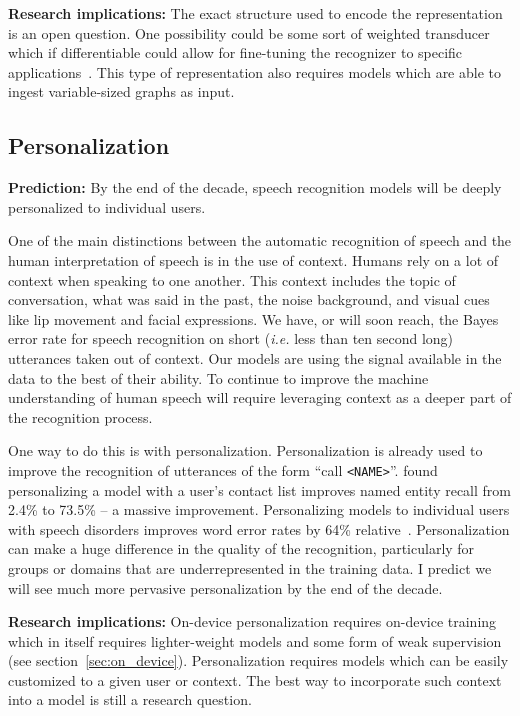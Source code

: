 {\bf Research implications:} The exact structure used to encode the
representation is an open question. One possibility could be some sort of
weighted transducer which if differentiable could allow for fine-tuning the
recognizer to specific applications~\cite{k2, hannun2020differentiable}. This
type of representation also requires models which are able to ingest
variable-sized graphs as input.

\subsection{Personalization}

{\bf Prediction:} By the end of the decade, speech recognition models will be
deeply personalized to individual users.

One of the main distinctions between the automatic recognition of speech and
the human interpretation of speech is in the use of context. Humans rely on a
lot of context when speaking to one another. This context includes the topic
of conversation, what was said in the past, the noise background, and visual
cues like lip movement and facial expressions. We have, or will soon
reach, the Bayes error rate for speech recognition on short (\emph{i.e.} less
than ten second long) utterances taken out of context. Our models are using the
signal available in the data to the best of their ability. To continue to
improve the machine understanding of human speech will require leveraging
context as a deeper part of the recognition process.

One way to do this is with personalization. Personalization is already used to
improve the recognition of utterances of the form ``call \texttt{<NAME>}''.
\citet{sim2019personalization} found personalizing a model with a user's
contact list improves named entity recall from 2.4\% to 73.5\% -- a massive
improvement. Personalizing models to individual users with speech disorders
improves word error rates by 64\% relative~\citep{sim2019investigation}.
Personalization can make a huge difference in the quality of the
recognition, particularly for groups or domains that are underrepresented in
the training data. I predict we will see much more pervasive personalization by
the end of the decade.

{\bf Research implications:} On-device personalization requires on-device
training which in itself requires lighter-weight models and some form of weak
supervision (see section~\ref{sec:on_device}).  Personalization requires models
which can be easily customized to a given user or context. The best way to
incorporate such context into a model is still a research question.
